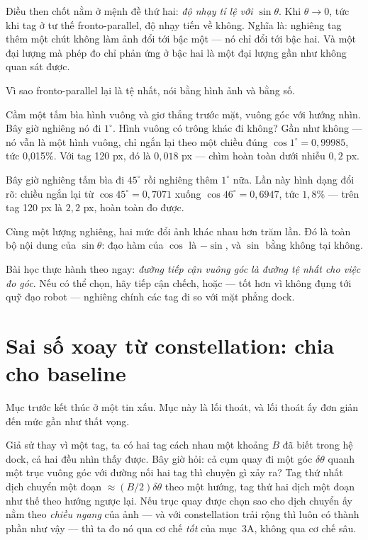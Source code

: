 \documentclass[../../marker.tex]{subfiles}
\begin{document}
Điều then chốt nằm ở mệnh đề thứ hai: \emph{độ nhạy tỉ lệ với \(\sin\theta\)}. Khi \(\theta \to 0\), tức khi tag ở tư thế fronto-parallel, độ nhạy tiến về không. Nghĩa là: nghiêng tag thêm một chút không làm ảnh đổi tới bậc một --- nó chỉ đổi tới bậc hai. Và một đại lượng mà phép đo chỉ phản ứng ở bậc hai là một đại lượng gần như không quan sát được.

\begin{trucgiac}
Vì sao fronto-parallel lại là tệ nhất, nói bằng hình ảnh và bằng số.

Cầm một tấm bìa hình vuông và giơ thẳng trước mặt, vuông góc với hướng nhìn. Bây giờ nghiêng nó đi \(1^\circ\). Hình vuông có trông khác đi không? Gần như không --- nó vẫn là một hình vuông, chỉ ngắn lại theo một chiều đúng \(\cos 1^\circ = 0{,}99985\), tức 0,015\%. Với tag 120 px, đó là \(0{,}018\) px --- chìm hoàn toàn dưới nhiễu \(0{,}2\) px.

Bây giờ nghiêng tấm bìa đi \(45^\circ\) rồi nghiêng thêm \(1^\circ\) nữa. Lần này hình dạng đổi rõ: chiều ngắn lại từ \(\cos 45^\circ = 0{,}7071\) xuống \(\cos 46^\circ = 0{,}6947\), tức \(1{,}8\%\) --- trên tag 120 px là \(2{,}2\) px, hoàn toàn đo được.

Cùng một lượng nghiêng, hai mức đổi ảnh khác nhau hơn trăm lần. Đó là toàn bộ nội dung của \(\sin\theta\): đạo hàm của \(\cos\) là \(-\sin\), và \(\sin\) bằng không tại không.

Bài học thực hành theo ngay: \emph{đường tiếp cận vuông góc là đường tệ nhất cho việc đo góc}. Nếu có thể chọn, hãy tiếp cận chếch, hoặc --- tốt hơn vì không đụng tới quỹ đạo robot --- nghiêng chính các tag đi so với mặt phẳng dock.
\end{trucgiac}

\section{Sai số xoay từ constellation: chia cho baseline}

Mục trước kết thúc ở một tin xấu. Mục này là lối thoát, và lối thoát ấy đơn giản đến mức gần như thất vọng.

Giả sử thay vì một tag, ta có hai tag cách nhau một khoảng \(B\) đã biết trong hệ dock, cả hai đều nhìn thấy được. Bây giờ hỏi: cả cụm quay đi một góc \(\delta\theta\) quanh một trục vuông góc với đường nối hai tag thì chuyện gì xảy ra? Tag thứ nhất dịch chuyển một đoạn \(\approx (B/2)\delta\theta\) theo một hướng, tag thứ hai dịch một đoạn như thế theo hướng ngược lại. Nếu trục quay được chọn sao cho dịch chuyển ấy nằm theo \emph{chiều ngang} của ảnh --- và với constellation trải rộng thì luôn có thành phần như vậy --- thì ta đo nó qua cơ chế \emph{tốt} của mục~3A, không qua cơ chế sâu.
\end{document}

